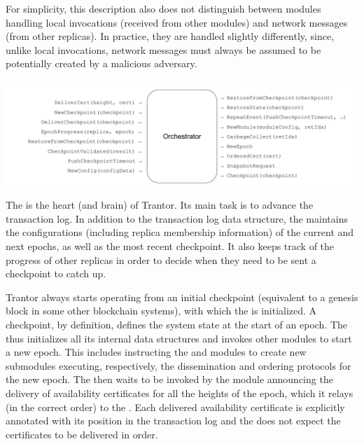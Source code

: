 \documentclass{article}
\begin{document}
For simplicity, this description also does not distinguish between modules handling local invocations (received from other modules)
and network messages (from other replicas).
In practice, they are handled slightly differently,
since, unlike local invocations, network messages must always be assumed to be potentially created by a malicious adversary.

\subsubsection{}

\includegraphics[width=\textwidth]{figures/modules/module-orchestrator.pdf}

The  is the heart (and brain) of Trantor.
Its main task is to advance the transaction log.
In addition to the transaction log data structure, the  maintains the configurations
(including replica membership information) of the current and  next epochs,
as well as the most recent checkpoint.
It also keeps track of the progress of other replicas in order to decide when they need to be sent a checkpoint to catch up.

Trantor always starts operating from an initial checkpoint (equivalent to a genesis block in some other blockchain systems),
with which the  is initialized.
A checkpoint, by definition, defines the system state at the start of an epoch.
The  thus initializes all its internal data structures
and invokes other modules to start a new epoch.
This includes instructing the  and  modules to create new submodules
executing, respectively, the dissemination and ordering protocols for the new epoch.
The  then waits to be invoked by the  module announcing the delivery of availability certificates
for all the heights of the epoch, which it relays (in the correct order) to the .
Each delivered availability certificate is explicitly annotated with its position in the transaction log
and the  does not expect the certificates to be delivered in order.
\end{document}
